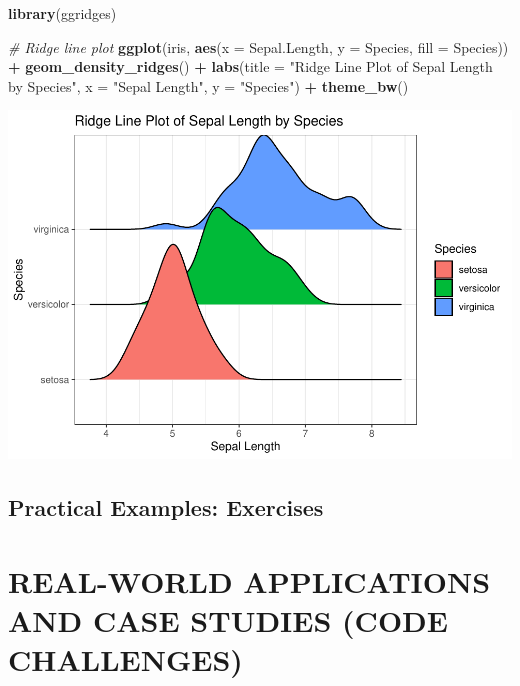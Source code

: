 \documentclass[
]{book}
\newenvironment{Shaded}{\begin{snugshade}}{\end{snugshade}}
\newcommand{\AttributeTok}[1]{\textcolor[rgb]{0.13,0.29,0.53}{#1}}
\newcommand{\CommentTok}[1]{\textcolor[rgb]{0.56,0.35,0.01}{\textit{#1}}}
\newcommand{\FunctionTok}[1]{\textcolor[rgb]{0.13,0.29,0.53}{\textbf{#1}}}
\newcommand{\NormalTok}[1]{#1}
\newcommand{\SpecialCharTok}[1]{\textcolor[rgb]{0.81,0.36,0.00}{\textbf{#1}}}
\newcommand{\StringTok}[1]{\textcolor[rgb]{0.31,0.60,0.02}{#1}}
\begin{document}
\begin{Shaded}
\begin{Highlighting}[]
\FunctionTok{library}\NormalTok{(ggridges)}

\CommentTok{\# Ridge line plot}
\FunctionTok{ggplot}\NormalTok{(iris, }\FunctionTok{aes}\NormalTok{(}\AttributeTok{x =}\NormalTok{ Sepal.Length, }\AttributeTok{y =}\NormalTok{ Species, }\AttributeTok{fill =}\NormalTok{ Species)) }\SpecialCharTok{+} 
  \FunctionTok{geom\_density\_ridges}\NormalTok{() }\SpecialCharTok{+}
  \FunctionTok{labs}\NormalTok{(}\AttributeTok{title =} \StringTok{"Ridge Line Plot of Sepal Length by Species"}\NormalTok{,}
       \AttributeTok{x =} \StringTok{"Sepal Length"}\NormalTok{, }\AttributeTok{y =} \StringTok{"Species"}\NormalTok{) }\SpecialCharTok{+}
  \FunctionTok{theme\_bw}\NormalTok{()}
\end{Highlighting}
\end{Shaded}

\includegraphics{_main_files/figure-latex/unnamed-chunk-94-1.pdf}

\section{Practical Examples: Exercises}\label{practical-examples-exercises-4}

\chapter{REAL-WORLD APPLICATIONS AND CASE STUDIES (CODE CHALLENGES)}\label{real-world-applications-and-case-studies-code-challenges}
\end{document}
